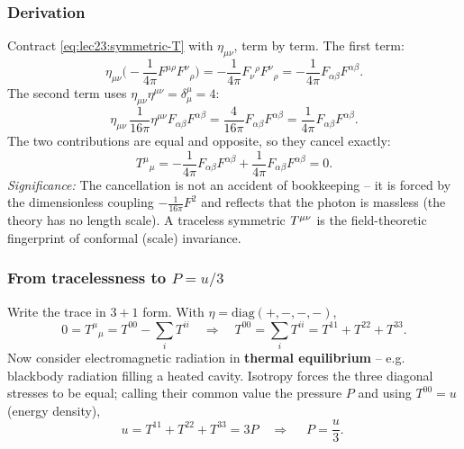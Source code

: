 
\subsubsection*{Derivation}
Contract \eqref{eq:lec23:symmetric-T} with $\eta_{\mu\nu}$, term by term. The first term:
\begin{equation}\label{eq:lec24:trace-1}
  \eta_{\mu\nu}\Big(-\frac{1}{4\pi}F^{\mu\rho}F^{\nu}{}_{\rho}\Big)
  =-\frac{1}{4\pi}F_{\nu}{}^{\rho}F^{\nu}{}_{\rho}
  =-\frac{1}{4\pi}F_{\alpha\beta}F^{\alpha\beta}.
\end{equation}
The second term uses $\eta_{\mu\nu}\eta^{\mu\nu}=\delta^{\mu}_{\mu}=4$:
\begin{equation}\label{eq:lec24:trace-2}
  \eta_{\mu\nu}\,\frac{1}{16\pi}\eta^{\mu\nu}F_{\alpha\beta}F^{\alpha\beta}
  =\frac{4}{16\pi}F_{\alpha\beta}F^{\alpha\beta}
  =\frac{1}{4\pi}F_{\alpha\beta}F^{\alpha\beta}.
\end{equation}
The two contributions are equal and opposite, so they cancel exactly:
\begin{equation}\label{eq:lec24:trace-sum}
  T^{\mu}{}_{\mu}=-\frac{1}{4\pi}F_{\alpha\beta}F^{\alpha\beta}
                +\frac{1}{4\pi}F_{\alpha\beta}F^{\alpha\beta}=0.
\end{equation}
\textit{Significance:} The cancellation is not an accident of bookkeeping -- it is forced by
the dimensionless coupling $-\tfrac{1}{16\pi}F^2$ and reflects that the photon is massless
(the theory has no length scale). A traceless symmetric $T^{\mu\nu}$ is the field-theoretic
fingerprint of conformal (scale) invariance.

\subsubsection*{From tracelessness to $P=u/3$}
Write the trace in $3+1$ form. With $\eta=\mathrm{diag}(+,-,-,-)$,
\begin{equation}\label{eq:lec24:trace-split}
  0=T^{\mu}{}_{\mu}=T^{00}-\sum_{i}T^{ii}
   \quad\Longrightarrow\quad
   T^{00}=\sum_{i}T^{ii}=T^{11}+T^{22}+T^{33}.
\end{equation}
Now consider electromagnetic radiation in \textbf{thermal equilibrium} -- e.g. blackbody
radiation filling a heated cavity. Isotropy forces the three diagonal stresses to be equal;
calling their common value the pressure $P$ and using $T^{00}=u$ (energy density),
\begin{equation}\label{eq:lec24:eos}
  u=T^{11}+T^{22}+T^{33}=3P
  \quad\Longrightarrow\quad
  \boxed{\;P=\frac{u}{3}.\;}
\end{equation}

